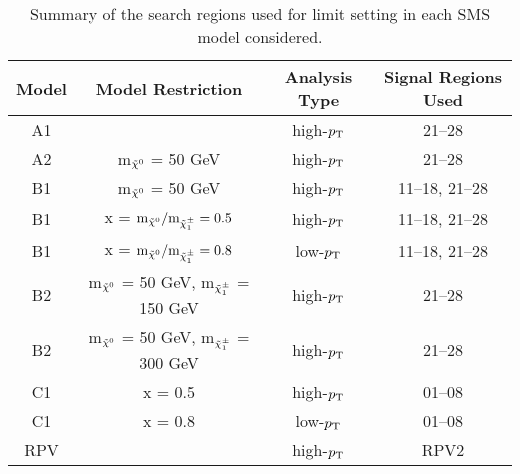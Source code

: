 \begin{table}[!hbt]
\begin{center}
\caption[Summary of the search regions used for limit setting in each SMS model considered]
{\label{tab:results_models_srs}
Summary of the search regions used for limit setting in each SMS model considered.
}
\begin{tabular}{|c|c|c|c|}
\hline\hline
Model                                     & Model Restriction                                & Analysis Type & Signal Regions Used \\ \hline\hline
A1                                        &                                                  & high-$p_{\mathrm{T}}$    & 21--28              \\ 
A2                                        & m$_{\tilde{\chi}^{0}}$ = 50 GeV                             & high-$p_{\mathrm{T}}$    & 21--28              \\ 
B1                                        & m$_{\tilde{\chi}^{0}}$ = 50 GeV                             & high-$p_{\mathrm{T}}$    & 11--18, 21--28      \\ 
B1                                        & x = $\text{m}_{\tilde{\chi}^{0}}/\text{m}_{\tilde{\chi}^{\pm}_1} = 0.5$ & high-$p_{\mathrm{T}}$    & 11--18, 21--28      \\ 
B1                                        & x = $\text{m}_{\tilde{\chi}^{0}}/\text{m}_{\tilde{\chi}^{\pm}_1} = 0.8$ & low-$p_{\mathrm{T}}$     & 11--18, 21--28      \\ 
B2                                        & m$_{\tilde{\chi}^{0}}$ = 50 GeV, m$_{\tilde{\chi}^{\pm}_1}$ = 150 GeV   & high-$p_{\mathrm{T}}$    & 21--28              \\ 
B2                                        & m$_{\tilde{\chi}^{0}}$ = 50 GeV, m$_{\tilde{\chi}^{\pm}_1}$ = 300 GeV   & high-$p_{\mathrm{T}}$    & 21--28              \\ 
C1                                        & x = 0.5                                          & high-$p_{\mathrm{T}}$    & 01--08              \\ 
C1                                        & x = 0.8                                          & low-$p_{\mathrm{T}}$     & 01--08              \\ 
RPV                                       &                                                  & high-$p_{\mathrm{T}}$    & RPV2                \\ 
\hline\hline
\end{tabular}
\end{center}
\end{table}

